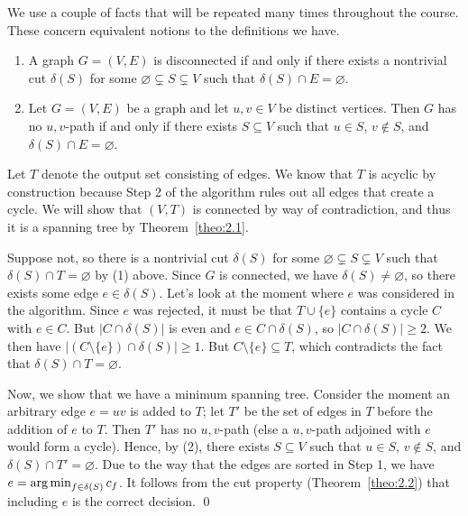 We use a couple of facts that will be repeated 
many times throughout the course. These concern equivalent 
notions to the definitions we have.
\begin{enumerate}[(1)]
    \item A graph $G = (V, E)$ is disconnected if and only if there exists a 
    nontrivial cut $\delta(S)$ for some $\varnothing \subsetneq S \subsetneq V$ such that 
    $\delta(S) \cap E = \varnothing$. 
    \item Let $G = (V, E)$ be a graph and let $u, v \in V$ be distinct vertices. 
    Then $G$ has no $u, v$-path if and only if there exists $S \subseteq V$ 
    such that $u \in S$, $v \notin S$, and $\delta(S) \cap E = \varnothing$. 
\end{enumerate}
\newpage
\begin{pf}
    Let $T$ denote the output set consisting of edges. We know that $T$ is 
    acyclic by construction because Step 2 of the algorithm rules 
    out all edges that create a cycle. We will show that $(V, T)$ is 
    connected by way of contradiction, and thus it is a spanning tree 
    by Theorem~\ref{theo:2.1}.

    Suppose not, so there is a nontrivial cut $\delta(S)$ for some $\varnothing \subsetneq S 
    \subsetneq V$ such that $\delta(S) \cap T = \varnothing$ by (1) above. 
    Since $G$ is connected, we have $\delta(S) \neq \varnothing$, so 
    there exists some edge $e \in \delta(S)$. 
    Let's look at the moment where $e$ was considered in the algorithm. 
    Since $e$ was rejected, it must be that $T \cup \{e\}$ contains a cycle 
    $C$ with $e \in C$. But $|C \cap \delta(S)|$ is even and $e \in 
    C \cap \delta(S)$, so $|C \cap \delta(S)| \geq 2$. We then have 
    $|(C \setminus \{e\}) \cap \delta(S)| \geq 1$. But $C \setminus \{e\} 
    \subseteq T$, which contradicts the fact that $\delta(S) \cap T = \varnothing$. 

    Now, we show that we have a minimum spanning tree. Consider the moment 
    an arbitrary edge $e = uv$ is added to $T$; let $T'$ be the set of edges 
    in $T$ before the addition of $e$ to $T$. Then $T'$ has no $u, v$-path 
    (else a $u, v$-path adjoined with $e$ would form a cycle). Hence, 
    by (2), there exists $S \subseteq V$ such that $u \in S$, $v \notin S$, 
    and $\delta(S) \cap T' = \varnothing$. Due to the way that the edges 
    are sorted in Step 1, we have $e = \operatorname*{arg\,min}_{f\in\delta(S)} c_f$. 
    It follows from the cut property (Theorem~\ref{theo:2.2}) that including 
    $e$ is the correct decision. \qed
\end{pf}\vspace{-0.25cm}

